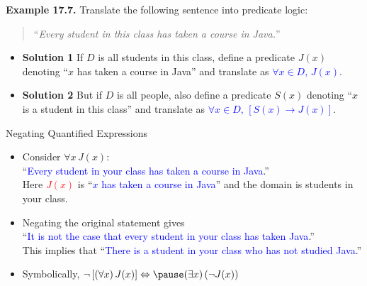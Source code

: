 \documentclass[aspectratio=169]{beamer}
\providecommand{\Blue}[1]{\textcolor{blue}{#1}}
\providecommand{\Red}[1]{\textcolor{red}{#1}}
\begin{document}
\begin{frame}[plain]{ }

 {\bf Example 17.7.} Translate the following sentence into
      predicate logic: 
        \begin{quote} 
         ``\emph{Every student in this class has taken
      a course in Java.}''\pause 
        \end{quote}
  
      \begin{itemize}
       \item {\bf Solution 1} If $D$ is all students in this class, define a
	predicate $J(x)$ denoting ``$x$ has taken a
	course in Java'' and translate as \Blue{$\forall x\in D,\, J(x)$}. \pause 
	\item {\bf Solution 2} But if $D$ is all people, also define a
	  predicate $S(x)$ denoting ``$x$ is a student in
         this class'' and translate as \Blue{$\forall x\in D,\, \left[ S(x)\rightarrow J(x)\right]$}.
  \end{itemize}
  
\vspace{.5in}

 
\end{frame}


\begin{frame}[plain]{Negating Quantified Expressions}
  
  \begin{itemize}
   \item Consider $\forall x\, J(x)$:\\
     ``\Blue{Every student in your class has taken a course in Java}.''\\
      Here \Red{$J(x)$} is ``\Blue{$x$ has taken a course in Java}'' and
      the domain is students in your class.
    \item  Negating the original statement gives \pause \\
     ``\Blue{It is not the case that every student in your class has taken Java}.''\\
    This implies that ``\Blue{There is a student in your class who
has not studied Java}.''
    \item Symbolically, 
    \Blue{$\neg\left[ (\forall x)\, J(x)\right]  \Leftrightarrow \pause (\exists x)\, (\neg J(x))$ }
 \end{itemize}
\end{frame}
\end{document}
